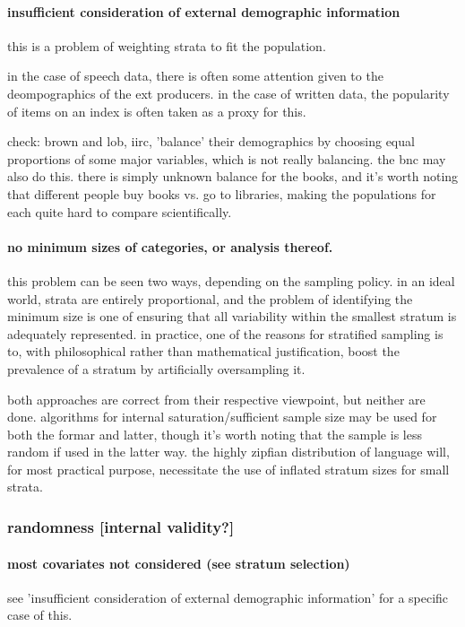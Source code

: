 \paragraph{ insufficient consideration of external demographic information}
this is a problem of weighting strata to fit the population.  

in the case of speech data, there is often some attention given to the deompographics of the ext producers.  in the case of written data, the popularity of items on an index is often taken as a proxy for this.  

check: brown and lob, iirc, 'balance' their demographics by choosing equal proportions of some major variables, which is not really balancing.  the bnc may also do this.  there is simply unknown balance for the books, and it's worth noting that different people buy books vs. go to libraries, making the populations for each quite hard to compare scientifically.



\paragraph{ no minimum sizes of categories, or analysis thereof.}
this problem can be seen two ways, depending on the sampling policy.  in an ideal world, strata are entirely proportional, and the problem of identifying the minimum size is one of ensuring that all variability within the smallest stratum is adequately represented.  in practice, one of the reasons for stratified sampling is to, with philosophical rather than mathematical justification, boost the prevalence of a stratum by artificially oversampling it.

both approaches are correct from their respective viewpoint, but neither are done.  algorithms for internal saturation/sufficient sample size may be used for both the formar and latter, though it's worth noting that the sample is less random if used in the latter way.  the highly zipfian distribution of language will, for most practical purpose, necessitate the use of inflated stratum sizes for small strata.



\subsubsection{randomness [internal validity?]}

\paragraph{ most covariates not considered (see stratum selection)}
see 'insufficient consideration of external demographic information' for a specific case of this.  

